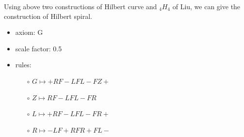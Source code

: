 \documentclass{article}
\begin{document}
Using above two constructions of Hilbert curve and ${}_4H_4$ of Liu, we can give the construction of Hilbert spiral.

\begin{itemize}
  \item axiom: G
  \item scale factor: 0.5
  \item rules: \begin{itemize}
      \item[$\circ$] $G \mapsto +RF-LFL-FZ+ $
      \item[$\circ$] $Z \mapsto RF-LFL-FR $
      \item[$\circ$] $L \mapsto +RF-LFL-FR+ $
      \item[$\circ$] $R \mapsto -LF+RFR+FL- $
  \end{itemize}
\end{itemize}

\end{document}
